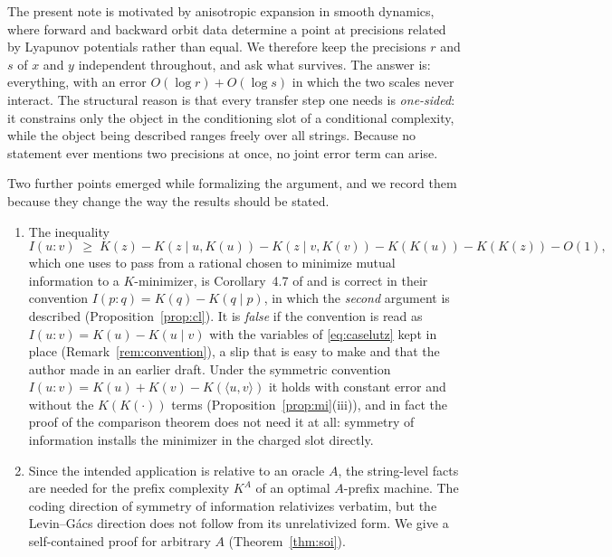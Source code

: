 \documentclass[11pt]{amsart}
\theoremstyle{definition}
\newcommand{\pair}[2]{\langle #1,#2\rangle}
\begin{document}
The present note is motivated by anisotropic expansion in smooth dynamics, where forward and backward orbit data determine a point at precisions related by Lyapunov potentials rather than equal.  We therefore keep the precisions $r$ and $s$ of $x$ and $y$ independent throughout, and ask what survives.  The answer is: everything, with an error $O(\log r)+O(\log s)$ in which the two scales never interact.  The structural reason is that every transfer step one needs is \emph{one-sided}: it constrains only the object in the conditioning slot of a conditional complexity, while the object being described ranges freely over all strings.  Because no statement ever mentions two precisions at once, no joint error term can arise.

Two further points emerged while formalizing the argument, and we record them because they change the way the results should be stated.

\begin{enumerate}[label=(\alph*)]
\item The inequality
\begin{equation}\label{eq:caselutz}
I(u:v)\;\ge\;K(z)-K(z\mid u,K(u))-K(z\mid v,K(v))-K(K(u))-K(K(z))-O(1),
\end{equation}
which one uses to pass from a rational chosen to minimize mutual information to a $K$-minimizer, is Corollary~4.7 of \cite{CaseLutz} and is correct in their convention $I(p:q)=K(q)-K(q\mid p)$, in which the \emph{second} argument is described (Proposition~\ref{prop:cl}).  It is \emph{false} if the convention is read as $I(u:v)=K(u)-K(u\mid v)$ with the variables of \eqref{eq:caselutz} kept in place (Remark~\ref{rem:convention}), a slip that is easy to make and that the author made in an earlier draft.  Under the symmetric convention $I(u:v)=K(u)+K(v)-K(\pair uv)$ it holds with constant error and without the $K(K(\cdot))$ terms (Proposition~\ref{prop:mi}(iii)), and in fact the proof of the comparison theorem does not need it at all: symmetry of information installs the minimizer in the charged slot directly.
\item Since the intended application is relative to an oracle $A$, the string-level facts are needed for the prefix complexity $K^A$ of an optimal $A$-prefix machine.  The coding direction of symmetry of information relativizes verbatim, but the Levin--G\'acs direction does not follow from its unrelativized form.  We give a self-contained proof for arbitrary $A$ (Theorem~\ref{thm:soi}).
\end{enumerate}
\end{document}
